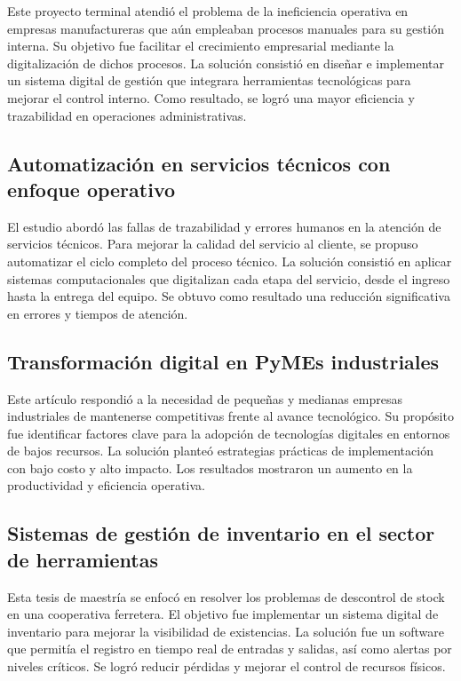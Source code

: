 Este proyecto terminal atendió el problema de la ineficiencia operativa en empresas manufactureras que aún empleaban procesos manuales para su gestión interna. Su objetivo fue facilitar el crecimiento empresarial mediante la digitalización de dichos procesos. La solución consistió en diseñar e implementar un sistema digital de gestión que integrara herramientas tecnológicas para mejorar el control interno. Como resultado, se logró una mayor eficiencia y trazabilidad en operaciones administrativas.

\subsection{Automatización en servicios técnicos con enfoque operativo \cite{Nin1992}}

El estudio abordó las fallas de trazabilidad y errores humanos en la atención de servicios técnicos. Para mejorar la calidad del servicio al cliente, se propuso automatizar el ciclo completo del proceso técnico. La solución consistió en aplicar sistemas computacionales que digitalizan cada etapa del servicio, desde el ingreso hasta la entrega del equipo. Se obtuvo como resultado una reducción significativa en errores y tiempos de atención.

\subsection{Transformación digital en PyMEs industriales \cite{Rodeiro2012}}

Este artículo respondió a la necesidad de pequeñas y medianas empresas industriales de mantenerse competitivas frente al avance tecnológico. Su propósito fue identificar factores clave para la adopción de tecnologías digitales en entornos de bajos recursos. La solución planteó estrategias prácticas de implementación con bajo costo y alto impacto. Los resultados mostraron un aumento en la productividad y eficiencia operativa.

\subsection{Sistemas de gestión de inventario en el sector de herramientas \cite{Flores2015}}

Esta tesis de maestría se enfocó en resolver los problemas de descontrol de stock en una cooperativa ferretera. El objetivo fue implementar un sistema digital de inventario para mejorar la visibilidad de existencias. La solución fue un software que permitía el registro en tiempo real de entradas y salidas, así como alertas por niveles críticos. Se logró reducir pérdidas y mejorar el control de recursos físicos.

